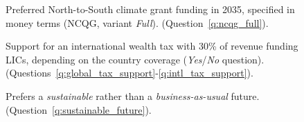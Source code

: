 \begin{figure}[h!]
    \caption[Preferred NCQG]{Preferred North-to-South climate grant funding in 2035, specified in money terms (NCQG, variant \textit{Full}). (Question~\ref{q:ncqg_full}).
    }\label{fig:ncqg_full}
\end{figure}

\begin{figure}[h!]
    \caption[Support for an international wealth depending on country coverage]{Support for an international wealth tax with 30\% of revenue funding LICs, depending on the country coverage (\textit{Yes}/\textit{No} question). (Questions~\ref{q:global_tax_support}-\ref{q:intl_tax_support}).
    }\label{fig:wealth_tax_heatmap}
\end{figure}

\begin{figure}[h!]
    \caption[Prefers a sustainable future]{Prefers a \textit{sustainable} rather than a \textit{business-as-usual} future. (Question~\ref{q:sustainable_future}).
    }\label{fig:sustainable_future}
\end{figure}

